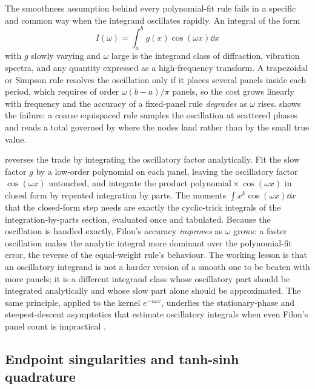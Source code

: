 The smoothness assumption behind every polynomial-fit rule fails in a
specific and common way when the integrand oscillates rapidly. An
integral of the form
\[
I(\omega) = \int_{a}^{b} g(x)\cos(\omega x)\dd x
\]
with $g$ slowly varying and $\omega$ large is the integrand class of
diffraction, vibration spectra, and any quantity expressed as a
high-frequency transform. A trapezoidal or Simpson rule resolves the
oscillation only if it places several panels inside each period, which
requires of order $\omega(b - a)/\pi$ panels, so the cost grows
linearly with frequency and the accuracy of a fixed-panel rule
\emph{degrades} as $\omega$ rises.
 shows the failure: a
coarse equispaced rule samples the oscillation at scattered phases and
reads a total governed by where the nodes land rather than by the small
true value.



 reverses the trade by integrating the
oscillatory factor analytically. Fit the slow factor $g$ by a low-order
polynomial on each panel, leaving the oscillatory factor $\cos(\omega
x)$ untouched, and integrate the product $\text{polynomial} \times
\cos(\omega x)$ in closed form by repeated integration by parts. The
moments $\int x^{k}\cos(\omega x)\dd x$ that the closed-form step needs
are exactly the cyclic-trick integrals of the integration-by-parts
section, evaluated once and tabulated. Because the oscillation is
handled exactly, Filon's accuracy \emph{improves} as $\omega$ grows: a
faster oscillation makes the analytic integral more dominant over the
polynomial-fit error, the reverse of the equal-weight rule's behaviour.
The working lesson is that an oscillatory integrand is not a harder
version of a smooth one to be beaten with more panels; it is a
different integrand class whose oscillatory part should be integrated
analytically and whose slow part alone should be approximated. The same
principle, applied to the kernel $e^{-i\omega x}$, underlies the
stationary-phase and steepest-descent asymptotics that estimate
oscillatory integrals when even Filon's panel count is impractical
\cite{text:v2ch06-trefethen-spectral}.

\subsection{Endpoint singularities and tanh-sinh
quadrature}


